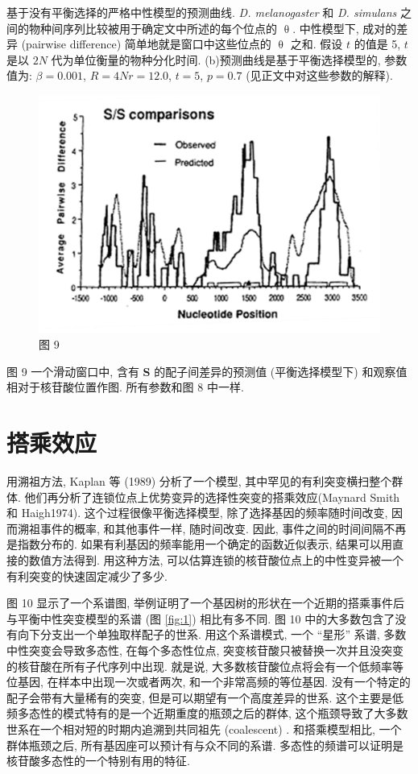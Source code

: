 \documentclass[12pt]{article}
\begin{document}
基于没有平衡选择的严格中性模型的预测曲线. \textit{D. melanogaster} 和 \textit{D. simulans}
之间的物种间序列比较被用于确定文中所述的每个位点的 $\uptheta$. 中性模型下, 成对的差异 (pairwise difference)
简单地就是窗口中这些位点的 $\uptheta$ 之和. 假设 $t$ 的值是 5, $t$ 是以 $2N$ 代为单位衡量的物种分化时间.
(b)预测曲线是基于平衡选择模型的, 参数值为: $\beta = 0.001$, $R = 4Nr = 12.0$, $t=5$, $p=0.7$
(见正文中对这些参数的解释).

\begin{figure}
    \centering
    \includegraphics{coalescent-process.images/image9.png}
    \caption{图 9}
\end{figure}

图 9 一个滑动窗口中, 含有 \textbf{S} 的配子间差异的预测值 (平衡选择模型下) 和观察值相对于核苷酸位置作图. 所有参数和图
8 中一样.

\section{搭乘效应}

用溯祖方法, Kaplan 等 (1989) 分析了一个模型, 其中罕见的有利突变横扫整个群体.
他们再分析了连锁位点上优势变异的选择性突变的搭乘效应(Maynard Smith 和 Haigh1974). 这个过程很像平衡选择模型,
除了选择基因的频率随时间改变, 因而溯祖事件的概率, 和其他事件一样, 随时间改变. 因此, 事件之间的时间间隔不再是指数分布的.
如果有利基因的频率能用一个确定的函数近似表示, 结果可以用直接的数值方法得到. 用这种方法,
可以估算连锁的核苷酸位点上的中性变异被一个有利突变的快速固定减少了多少.

图 10 显示了一个系谱图, 举例证明了一个基因树的形状在一个近期的搭乘事件后与平衡中性突变模型的系谱 (图
\ref{fig:1}) 相比有多不同. 图 10 中的大多数包含了没有向下分支出一个单独取样配子的世系. 用这个系谱模式,
一个 ``星形'' 系谱, 多数中性突变会导致多态性, 在每个多态性位点,
突变核苷酸只被替换一次并且没突变的核苷酸在所有子代序列中出现. 就是说, 大多数核苷酸位点将会有一个低频率等位基因,
在样本中出现一次或者两次, 和一个非常高频的等位基因. 没有一个特定的配子会带有大量稀有的突变,
但是可以期望有一个高度差异的世系. 这个主要是低频多态性的模式特有的是一个近期重度的瓶颈之后的群体,
这个瓶颈导致了大多数世系在一个相对短的时期内追溯到共同祖先 (coalescent) . 和搭乘模型相比, 一个群体瓶颈之后,
所有基因座可以预计有与众不同的系谱. 多态性的频谱可以证明是核苷酸多态性的一个特别有用的特征.
\end{document}
